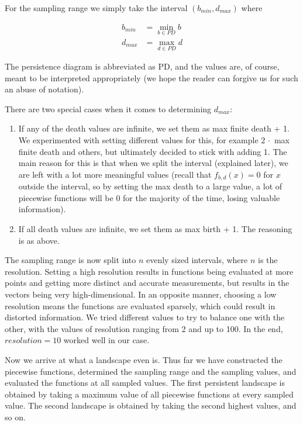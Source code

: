 \documentclass{article}
\begin{document}
For the sampling range we simply take the interval $(b_{min}, d_{max})$ where

\begin{align*}
    b_{min} &= \min_{b \in PD} b \\
    d_{max} &= \max_{d \in PD} d    
\end{align*}

The persistence diagram is abbreviated as PD, and the values are, of course, meant to be interpreted appropriately (we hope the reader can forgive us for such an abuse of notation).

There are two special cases when it comes to determining $d_{max}$:

\begin{enumerate}
    \item If any of the death values are infinite, we set them as max finite death + 1. We experimented with setting different values for this, for example $2\, \cdot$ max finite death and others, but ultimately decided to stick with adding 1. The main reason for this is that when we split the interval (explained later), we are left with a lot more meaningful values (recall that $f_{b,d}(x) = 0$ for $x$ outside the interval, so by setting the max death to a large value, a lot of piecewise functions will be 0 for the majority of the time, losing valuable information).
    \item If all death values are infinite, we set them as max birth + 1. The reasoning is as above.
\end{enumerate}

The sampling range is now split into $n$ evenly sized intervals, where $n$ is the resolution. Setting a high resolution results in functions being evaluated at more points and getting more distinct and accurate measurements, but results in the vectors being very high-dimensional. In an opposite manner, choosing a low resolution means the functions are evaluated sparsely, which could result in distorted information. We tried different values to try to balance one with the other, with the values of resolution ranging from 2 and up to 100. In the end, $resolution = 10$ worked well in our case.

Now we arrive at what a landscape even is. Thus far we have constructed the piecewise functions, determined the sampling range and the sampling values, and evaluated the functions at all sampled values. The first persistent landscape is obtained by taking a maximum value of all piecewise functions at every sampled value. The second landscape is obtained by taking the second highest values, and so on.
\end{document}
